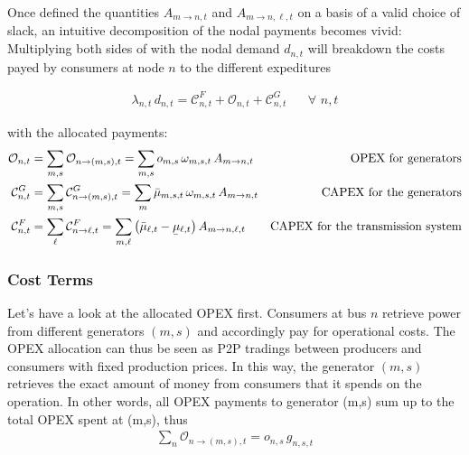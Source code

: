 \documentclass[11pt]{article}
\newcommand{\ubar}[1]{\underaccent{\bar}{#1}}
\newcommand{\generation}[1][n]{g_{#1,s,t}}
\newcommand{\generationshare}[1][n]{\omega_{#1,s,t}}
\newcommand{\opexGeneration}[1][n]{o_{#1,s}}
\newcommand{\demandnodal}[1][n]{d_{#1,t}}
\newcommand{\muuppergeneration}[1][n]{\bar{\mu}_{#1,s,t}}
\newcommand{\mulowerflow}{\ubar{\mu}_{\ell,t}}
\newcommand{\muupperflow}{\bar{\mu}_{\ell,t}}
\newcommand{\lmp}[1][n]{\lambda_{#1,t}}
\newcommand{\allocatePeer}[1][m \rightarrow n]{A_{#1,t}}
\newcommand{\allocateTransaction}[1][m \rightarrow n]{A_{#1,\ell,t}}
\newcommand{\allocateCapexGeneration}[1][n]{\mathcal{C}^{G}_{#1,t}}
\newcommand{\allocateCapexFlow}[1][n]{\mathcal{C}^{F}_{#1,t}}
\newcommand{\allocateOpex}[1][n]{\mathcal{O}_{#1,t}}
\newcommand{\Forall}[1]{\hspace{20pt} \forall \,\, #1 }
\begin{document}
Once defined the quantities $\allocatePeer$ and $\allocateTransaction$ on a basis of a valid choice of slack, an intuitive decomposition of the nodal payments becomes vivid: Multiplying both sides of   with the nodal demand $\demandnodal$ will breakdown the costs payed by consumers at node $n$ to the different expeditures

\begin{align}
 \lmp \, \demandnodal = \allocateCapexFlow + \allocateOpex + \allocateCapexGeneration \Forall{n,t}
 \label{eq:lmp_allocation}
\end{align}

with the allocated payments: \\
\begin{align}
 \allocateOpex &= 
 \sum_{m,s} \allocateOpex[n \rightarrow (m,s)]= 
 \sum_{m,s} \opexGeneration[m] \, \generationshare[m] \, \allocatePeer 
 &\text{OPEX for generators} 
\label{eq:allocate_opexGeneration}\\
 \allocateCapexGeneration &= 
 \sum_{m,s} \allocateCapexGeneration[n \rightarrow (m,s)] = 
 \sum_m \muuppergeneration[m] \, \generationshare[m] \, \allocatePeer
 &\text{CAPEX for the generators} 
\label{eq:allocate_capexGeneration} \\
 \allocateCapexFlow &=  
 \sum_{\ell} \allocateCapexFlow[n \rightarrow \ell] =  
 \sum_{m,\ell} \left( \muupperflow - \mulowerflow\right) \allocateTransaction  
 &\text{CAPEX for the transmission system} 
\label{eq:allocate_capexFlow}
\end{align}

\subsubsection*{Cost Terms}

Let's have a look at the allocated OPEX first. Consumers at bus $n$ retrieve power from different generators $(m,s)$ and accordingly pay for operational costs. The OPEX allocation can thus be seen as P2P tradings between producers and consumers with fixed production prices. In this way, the generator $(m,s)$ retrieves the exact amount of money from consumers that it spends on the operation. In other words, all OPEX payments to generator (m,s) sum up to the total OPEX spent at (m,s), thus 
\begin{align}
\sum_{n} \allocateOpex[n \rightarrow (m,s)] = \opexGeneration \, \generation
\label{eq:no_profit_opex}
\end{align}
\end{document}
